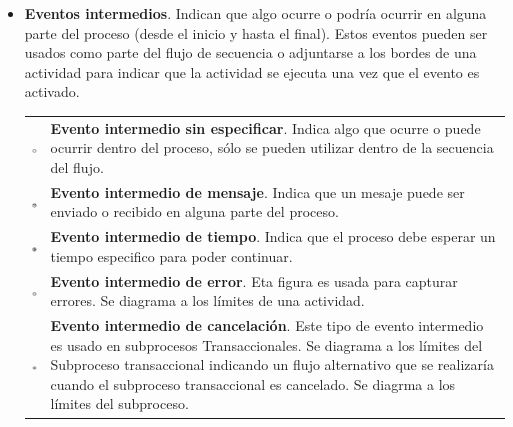 \begin{itemize}
	\item {\bf Eventos intermedios}. Indican que algo ocurre o podría ocurrir en alguna parte del proceso (desde el inicio y hasta el final). Estos eventos pueden ser usados como parte del flujo de secuencia o adjuntarse a los bordes de una actividad para indicar que la actividad se ejecuta una vez que el evento es activado.

	\begin{tabular}{| m{} m{} | }%
		\rowcolor[gray]{0.97}%
		\centering\noindent\includegraphics[width=18pt]{introduccion/imagenes/procesos/bpmn/IntermediateEvent.png} & {\bf Evento intermedio sin especificar}. Indica algo que ocurre o puede ocurrir dentro del proceso, sólo se pueden utilizar dentro de la secuencia del flujo. \\
		\centering\noindent\includegraphics[width=18pt]{introduccion/imagenes/procesos/bpmn/MessageEvent.png} & {\bf Evento intermedio de mensaje}. Indica que un mesaje puede ser enviado o recibido en alguna parte del proceso. \\
		\rowcolor[gray]{0.97}%
		\centering\noindent\includegraphics[width=18pt]{introduccion/imagenes/procesos/bpmn/TimerEventIntermediate.png} & {\bf Evento intermedio de tiempo}. Indica que el proceso debe esperar un tiempo especifico para poder continuar.\\
		\centering\noindent\includegraphics[width=18pt]{introduccion/imagenes/procesos/bpmn/ErrorIntermediateEvent.png} & {\bf Evento intermedio de error}. Eta figura es usada para capturar errores. Se diagrama a los límites de una actividad. \\
		\rowcolor[gray]{0.97}%
		\centering\noindent\includegraphics[width=18pt]{introduccion/imagenes/procesos/bpmn/CancelIntermediateEvent.png} & {\bf Evento intermedio de cancelación}. Este tipo de evento intermedio es usado en subprocesos Transaccionales. Se diagrama a los límites del Subproceso transaccional indicando un flujo alternativo que se realizaría cuando el subproceso transaccional es cancelado. Se diagrma a los límites del subproceso. \\

\end{tabular}
\end{itemize}

